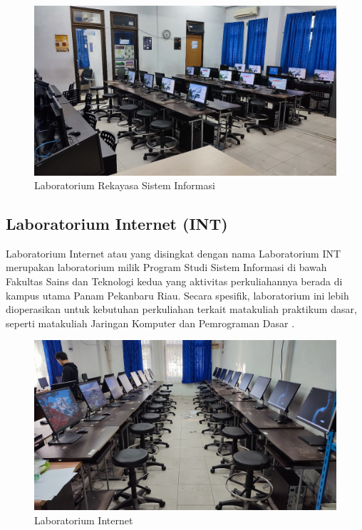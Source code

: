 \begin{figure}
	\centering
	\includegraphics[width=0.82\linewidth]{konten/gambar/lab-rsi.jpg}
	\caption{Laboratorium Rekayasa Sistem Informasi \protect\cite{labsi2023}}
	\label{fig:lab-rsi}
\end{figure}

\subsection{Laboratorium Internet (INT)}
Laboratorium Internet atau yang disingkat dengan nama Laboratorium INT merupakan laboratorium milik Program Studi Sistem Informasi di bawah Fakultas Sains dan Teknologi kedua yang aktivitas perkuliahannya berada di kampus utama Panam Pekanbaru Riau. Secara spesifik, laboratorium ini lebih dioperasikan untuk kebutuhan perkuliahan terkait matakuliah praktikum dasar, seperti matakuliah Jaringan Komputer dan Pemrograman Dasar \cite{lab-si-website}.

\begin{figure}
	\centering
	\includegraphics[width=0.82\linewidth]{konten/gambar/lab-internet.jpg}
	\caption{Laboratorium Internet \protect\cite{labsi2023}}
	\label{fig:lab-int}
\end{figure}

